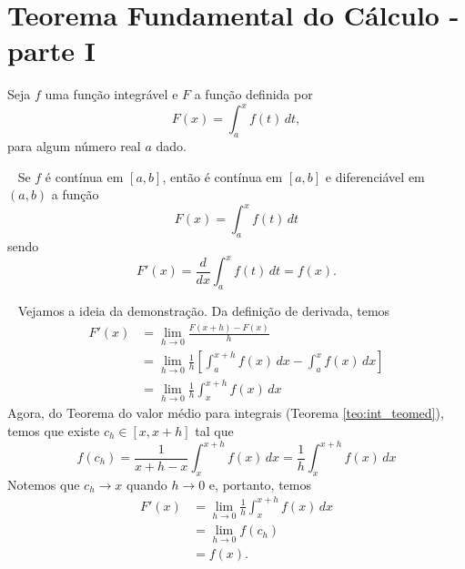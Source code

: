 \cleardoublepage\documentclass[../main.tex]{subfiles}
\begin{document}
\section{Teorema Fundamental do Cálculo - parte I}\hypertarget{TFC}{}
Seja $f$ uma função integrável e $F$ a função definida por
\begin{equation}
  F(x) = \int_a^x f(t)\,dt,
\end{equation}
para algum número real $a$ dado.

\begin{framed}
\begin{teo}~\label{teo:int_tfc1}
  Se $f$ é contínua em $[a, b]$, então é contínua em $[a, b]$ e diferenciável em $(a, b)$ a função
  \begin{equation}
    F(x) = \int_a^x f(t)\,dt
  \end{equation}
  sendo
  \begin{equation}
    F'(x) = \frac{d}{dx}\int_a^x f(t)\,dt = f(x).
  \end{equation}
\end{teo}
\begin{framed}
\begin{dem}~
 Vejamos a ideia da demonstração. Da definição de derivada, temos
  \begin{align*}
    F'(x) &= \lim_{h\to 0} \frac{F(x+h) - F(x)}{h} \\
          &= \lim_{h\to 0} \frac{1}{h}\left[\int_a^{x+h} f(x)\,dx - \int_a^x f(x)\, dx\right] \\
          &= \lim_{h\to 0} \frac{1}{h}\int_x^{x+h} f(x)\,dx
  \end{align*}
  Agora, do Teorema do valor médio para integrais (Teorema \ref{teo:int_teomed}), temos que existe $c_h \in [x, x+h]$ tal que
  \begin{equation*}
    f(c_h) = \frac{1}{x+h-x}\int_x^{x+h} f(x)\,dx = \frac{1}{h}\int_x^{x+h} f(x)\,dx
  \end{equation*}
  Notemos que $c_h\to x$ quando $h\to 0$ e, portanto, temos
  \begin{align*}
    F'(x) &= \lim_{h\to 0} \frac{1}{h}\int_x^{x+h} f(x)\,dx \\
          &= \lim_{h\to 0} f(c_h) \\
          &= f(x).
  \end{align*}
\end{dem}\end{framed}\end{framed}
\end{document}
